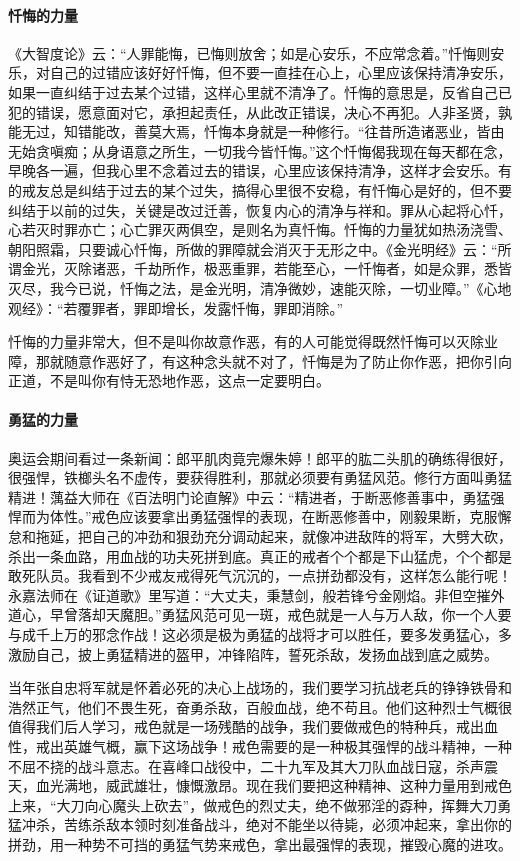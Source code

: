 \paragraph{忏悔的力量}

《大智度论》云：“人罪能悔，已悔则放舍；如是心安乐，不应常念着。”忏悔则安乐，对自己的过错应该好好忏悔，但不要一直挂在心上，心里应该保持清净安乐，如果一直纠结于过去某个过错，这样心里就不清净了。忏悔的意思是，反省自己已犯的错误，愿意面对它，承担起责任，从此改正错误，决心不再犯。人非圣贤，孰能无过，知错能改，善莫大焉，忏悔本身就是一种修行。“往昔所造诸恶业，皆由无始贪嗔痴；从身语意之所生，一切我今皆忏悔。”这个忏悔偈我现在每天都在念，早晚各一遍，但我心里不念着过去的错误，心里应该保持清净，这样才会安乐。有的戒友总是纠结于过去的某个过失，搞得心里很不安稳，有忏悔心是好的，但不要纠结于以前的过失，关键是改过迁善，恢复内心的清净与祥和。罪从心起将心忏，心若灭时罪亦亡；心亡罪灭两俱空，是则名为真忏悔。忏悔的力量犹如热汤浇雪、朝阳照霜，只要诚心忏悔，所做的罪障就会消灭于无形之中。《金光明经》云：“所谓金光，灭除诸恶，千劫所作，极恶重罪，若能至心，一忏悔者，如是众罪，悉皆灭尽，我今已说，忏悔之法，是金光明，清净微妙，速能灭除，一切业障。”《心地观经》：“若覆罪者，罪即增长，发露忏悔，罪即消除。”

忏悔的力量非常大，但不是叫你故意作恶，有的人可能觉得既然忏悔可以灭除业障，那就随意作恶好了，有这种念头就不对了，忏悔是为了防止你作恶，把你引向正道，不是叫你有恃无恐地作恶，这点一定要明白。

\paragraph{勇猛的力量}

奥运会期间看过一条新闻：郎平肌肉竟完爆朱婷！郎平的肱二头肌的确练得很好，很强悍，铁榔头名不虚传，要获得胜利，那就必须要有勇猛风范。修行方面叫勇猛精进！蕅益大师在《百法明门论直解》中云：“精进者，于断恶修善事中，勇猛强悍而为体性。”戒色应该要拿出勇猛强悍的表现，在断恶修善中，刚毅果断，克服懈怠和拖延，把自己的冲劲和狠劲充分调动起来，就像冲进敌阵的将军，大劈大砍，杀出一条血路，用血战的功夫死拼到底。真正的戒者个个都是下山猛虎，个个都是敢死队员。我看到不少戒友戒得死气沉沉的，一点拼劲都没有，这样怎么能行呢！永嘉法师在《证道歌》里写道：“大丈夫，秉慧剑，般若锋兮金刚焰。非但空摧外道心，早曾落却天魔胆。”勇猛风范可见一斑，戒色就是一人与万人敌，你一个人要与成千上万的邪念作战！这必须是极为勇猛的战将才可以胜任，要多发勇猛心，多激励自己，披上勇猛精进的盔甲，冲锋陷阵，誓死杀敌，发扬血战到底之威势。

当年张自忠将军就是怀着必死的决心上战场的，我们要学习抗战老兵的铮铮铁骨和浩然正气，他们不畏生死，奋勇杀敌，百般血战，绝不苟且。他们这种烈士气概很值得我们后人学习，戒色就是一场残酷的战争，我们要做戒色的特种兵，戒出血性，戒出英雄气概，赢下这场战争！戒色需要的是一种极其强悍的战斗精神，一种不屈不挠的战斗意志。在喜峰口战役中，二十九军及其大刀队血战日寇，杀声震天，血光满地，威武雄壮，慷慨激昂。现在我们要把这种精神、这种力量用到戒色上来，“大刀向心魔头上砍去”，做戒色的烈丈夫，绝不做邪淫的孬种，挥舞大刀勇猛冲杀，苦练杀敌本领时刻准备战斗，绝对不能坐以待毙，必须冲起来，拿出你的拼劲，用一种势不可挡的勇猛气势来戒色，拿出最强悍的表现，摧毁心魔的进攻。


